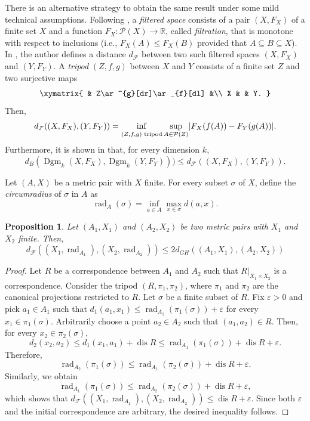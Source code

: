 \documentclass[8pt,a4paper,oneside,english,english]{article}
\theoremstyle{plain}
\theoremstyle
{plain}
\newtheorem{proposition}[theorem]{Proposition}%
\theoremstyle{definition}
\newcommand{\R}{\mathbb{R}}
\newcommand{\GH}{d_{GH}}
\newcommand{\newinf}{\mathop{\mathrm{inf}\vphantom{\mathrm{sup}}}}
\DeclareMathOperator{\dis}{dis}
\DeclareMathOperator{\Dgm}{Dgm}
\DeclareMathOperator{\rad}{rad}
\begin{document}
There is an alternative strategy to obtain the same result under some mild technical assumptions. Following \cite{Mem_tripods}, a {\em filtered space} consists of a pair $(X,F_X)$ of a finite set $X$ and a function $F_X\colon\mathcal P(X)\to\R$, called {\em filtration}, that is monotone with respect to inclusions (i.e., $F_X(A)\leq F_X(B)$ provided that $A\subseteq B\subseteq X$).
In \cite{Mem_tripods}, the author defines a distance $d_{\mathcal F}$ between two such filtered spaces $(X,F_X)$ and $(Y,F_Y)$. 
A {\em tripod} $(Z,f,g)$ between $X$ and $Y$ consists of a finite set $Z$ and two surjective maps
    \[
    \xymatrix{
        & Z\ar^{g}[dr]\ar_{f}[dl] &\\
        X & & Y.
    }
    \]
Then, 
\[
d_{\mathcal F}((X,F_X),(Y,F_Y)
)=\newinf_{(Z,f,g)\text{ tripod}}\sup_{A\in\mathcal P(Z)}\lvert F_X(f(A))-F_Y(g(A))\rvert.
\]
Furthermore, it is shown in \cite[Proposition 5.1]{Mem_tripods} that, for every dimension $k$,
\begin{equation}\label{eq:stability_and_tripods}
	d_B(\Dgm_k(X,F_X),\Dgm_k(Y,F_Y)))\leq d_{\mathcal F}((X,F_X),(Y,F_Y)).
\end{equation}

Let $(A,X)$ be a metric pair with $X$ finite. For every subset $\sigma$ of $X$, define the {\em circumradius} of $\sigma$ in $A$ as
\begin{equation}\label{eq:circumradius}
    \rad_A(\sigma)=\inf_{a\in A}\max_{x\in \sigma}d(a,x).
\end{equation}

\begin{proposition}\label{prop:tripods}
    Let $(A_1,X_1)$ and $(A_2,X_2)$ be two metric pairs with $X_1$ and $X_2$ finite. Then,
    \[
        d_{\mathcal F}((X_1,\rad_{A_1}),(X_2,\rad_{A_2}))\leq 2\GH((A_1,X_1),(A_2,X_2))
    \]
\end{proposition}
\begin{proof}
    Let $R$ be a correspondence between $A_1$ and $A_2$ such that $R|_{X_1\times X_2}$ is a correspondence. Consider the tripod $(R,\pi_1,\pi_2)$, where $\pi_1$ and $\pi_2$ are the canonical projections restricted to $R$. Let $\sigma$ be a finite subset of $R$. Fix $\varepsilon>0$ and pick $a_1\in A_1$ such that $d_1(a_1,x_1)\leq\rad_{A_1}(\pi_1(\sigma))+\varepsilon$ for every $x_1\in\pi_1(\sigma)$. Arbitrarily choose a point $a_2\in A_2$ such that $(a_1,a_2)\in R$. Then, for every $x_2\in \pi_2(\sigma)$,
    \[
    d_2(x_2,a_2)\leq d_1(x_1,a_1)+\dis R\leq\rad_{A_1}(\pi_1(\sigma))+\dis R+\varepsilon.
    \]
    Therefore, \[\rad_{A_2}(\pi_1(\sigma))\leq\rad_{A_1}(\pi_2(\sigma))+\dis R+\varepsilon.
    \]
    Similarly, we obtain
    \[
    \rad_{A_1}(\pi_1(\sigma))\leq\rad_{A_2}(\pi_2(\sigma))+\dis R+\varepsilon,
    \]
    which shows that $d_{\mathcal F}((X_1,\rad_{A_1}),(X_2,\rad_{A_2}))\leq\dis R+\varepsilon$. Since both $\varepsilon$ and the initial correspondence are arbitrary, the desired inequality follows.
\end{proof}
\end{document}

